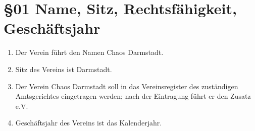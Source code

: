 \section*{§01 Name, Sitz, Rechtsfähigkeit, Geschäftsjahr}
\begin{enumerate}
\item Der Verein führt den Namen Chaos Darmstadt. 
\item Sitz des Vereins ist Darmstadt.
\item Der Verein Chaos Darmstadt soll in das Vereinsregister des zuständigen
Amtsgerichtes eingetragen werden; nach der Eintragung führt er den
Zusatz e.V.
\item Geschäftsjahr des Vereins ist das Kalenderjahr.
\end{enumerate}
